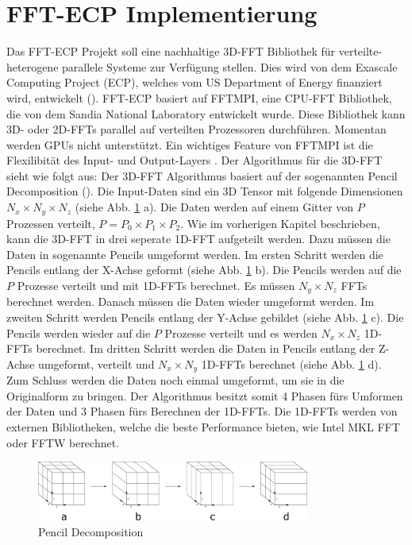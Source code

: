 \section{FFT-ECP Implementierung}
Das FFT-ECP Projekt soll eine nachhaltige 3D-FFT Bibliothek für verteilte-heterogene parallele Systeme zur Verfügung stellen. Dies wird von dem Exascale Computing Project (ECP), welches vom US Department of Energy finanziert wird, entwickelt (\cite[S. 1]{mainpaper}). 
\newline
FFT-ECP basiert auf FFTMPI, eine CPU-FFT Bibliothek, die von dem Sandia National Laboratory entwickelt wurde. Diese Bibliothek kann 3D- oder 2D-FFTs parallel auf verteilten Prozessoren durchführen. Momentan werden GPUs nicht unterstützt. Ein wichtiges Feature von FFTMPI ist die Flexilibität des Input- und Output-Layers \cite[S.2]{mainpaper}. 
\newline
Der Algorithmus für die 3D-FFT sieht wie folgt aus:
\newline
Der 3D-FFT Algorithmus basiert auf der sogenannten Pencil Decomposition (\cite[S.1-2]{aya 19}).
Die Input-Daten sind ein 3D Tensor mit folgende Dimensionen $N_{x} \times N_{y} \times N_{z}$ (siehe Abb. \ref{fig:pencildecomposition} a). Die Daten werden auf einem Gitter von $P$ Prozessen verteilt, $P=P_0 \times P_1 \times P_2$. Wie im vorherigen Kapitel beschrieben, kann die 3D-FFT in drei seperate 1D-FFT aufgeteilt werden. Dazu müssen die Daten in sogenannte Pencils umgeformt werden. 
\newline
Im ersten Schritt werden die Pencils entlang der X-Achse geformt (siehe Abb. \ref{fig:pencildecomposition} b). Die Pencils werden auf die $P$ Prozesse verteilt und mit 1D-FFTs berechnet. Es müssen $N_y \times N_{z}$ FFTs berechnet werden. Danach müssen die Daten wieder umgeformt werden. 
\newline
Im zweiten Schritt werden Pencils entlang der Y-Achse gebildet (siehe Abb. \ref{fig:pencildecomposition} c). Die Pencils werden wieder auf die $P$ Prozesse verteilt und es werden $N_x \times N_z$ 1D-FFTs berechnet. 
\newline
Im dritten Schritt werden die Daten in Pencils entlang der Z-Achse umgeformt, verteilt und $N_x \times N_y$ 1D-FFTs berechnet (siehe Abb. \ref{fig:pencildecomposition} d). Zum Schluss werden die Daten noch einmal umgeformt, um sie in die Originalform zu bringen. 
\newline
Der Algorithmus besitzt somit 4 Phasen fürs Umformen der Daten und 3 Phasen fürs Berechnen der 1D-FFTs. Die 1D-FFTs werden von externen Bibliotheken, welche die beste Performance bieten, wie Intel MKL FFT oder FFTW berechnet.

\begin{figure}
\centering
 \includegraphics[width=0.8\textwidth]{Pictures/PencilsDecomposition.png}
\caption{Pencil Decomposition}
\label{fig:pencildecomposition}
\end{figure} 





